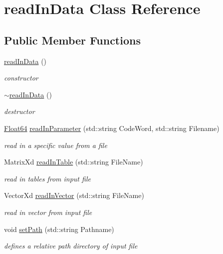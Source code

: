 \hypertarget{classread_in_data}{}\section{read\+In\+Data Class Reference}
\label{classread_in_data}
\subsection*{Public Member Functions}
\begin{DoxyCompactItemize}
\item 
\mbox{\label{classread_in_data_adf5f563c9d967b1291c8a26c61b33c27}} 
\hyperlink{classread_in_data_adf5f563c9d967b1291c8a26c61b33c27}{read\+In\+Data} ()
\begin{DoxyCompactList}\small\item\em constructor \end{DoxyCompactList}\item 
\mbox{\label{classread_in_data_af34d37cf1fb596bca7f1f9c1c97fd2eb}} 
\hyperlink{classread_in_data_af34d37cf1fb596bca7f1f9c1c97fd2eb}{$\sim$read\+In\+Data} ()
\begin{DoxyCompactList}\small\item\em destructor \end{DoxyCompactList}\item 
\hyperlink{group___tools_ga3f1431cb9f76da10f59246d1d743dc2c}{Float64} \hyperlink{classread_in_data_a9ae979e74958b43424cb6cf4a22043d7}{read\+In\+Parameter} (std\+::string Code\+Word, std\+::string Filename)
\begin{DoxyCompactList}\small\item\em read in a specific value from a file \end{DoxyCompactList}\item 
Matrix\+Xd \hyperlink{classread_in_data_af616573832efc2c27f07f5f6877b1386}{read\+In\+Table} (std\+::string File\+Name)
\begin{DoxyCompactList}\small\item\em read in tables from input file \end{DoxyCompactList}\item 
Vector\+Xd \hyperlink{classread_in_data_ab57aff38529234593d786ecace301cf7}{read\+In\+Vector} (std\+::string File\+Name)
\begin{DoxyCompactList}\small\item\em read in vector from input file \end{DoxyCompactList}\item 
void \hyperlink{classread_in_data_ad67d566fd837f6d721db279144d484e0}{set\+Path} (std\+::string Pathname)
\begin{DoxyCompactList}\small\item\em defines a relative path directory of input file \end{DoxyCompactList}\end{DoxyCompactItemize}


